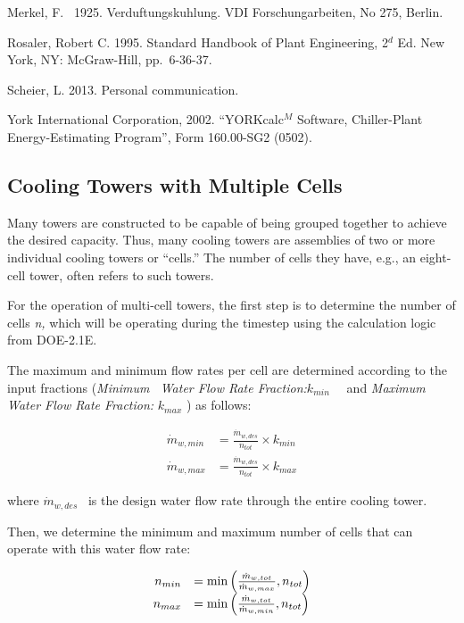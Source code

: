 Merkel, F.~ 1925. Verduftungskuhlung. VDI Forschungarbeiten, No 275, Berlin.

Rosaler, Robert C. 1995. Standard Handbook of Plant Engineering, 2\(^{d}\) Ed. New York, NY: McGraw-Hill, pp.~6-36-37.

Scheier, L. 2013. Personal communication.

York International Corporation, 2002. ``YORKcalc\(^{M}\) Software, Chiller-Plant Energy-Estimating Program'', Form 160.00-SG2 (0502).

\subsection{Cooling Towers with Multiple Cells}\label{cooling-towers-with-multiple-cells}

Many towers are constructed to be capable of being grouped together to achieve the desired capacity. Thus, many cooling towers are assemblies of two or more individual cooling towers or ``cells.'' The number of cells they have, e.g., an eight-cell tower, often refers to such towers.

For the operation of multi-cell towers, the first step is to determine the number of cells \emph{n,} which will be operating during the timestep using the calculation logic from DOE-2.1E.

The maximum and minimum flow rates per cell are determined according to the input fractions (\emph{Minimum~ Water Flow Rate Fraction:}\({k_{min}}\) \emph{~}~and \emph{Maximum~ Water Flow Rate Fraction:} \({k_{max}}\) ) as follows:

\begin{equation}
    \begin{array}{rl}
      \dot{m}_{w,min} &= \frac{\dot{m}_{w,des}}{n_{tot}} \times k_{min} \\
      \dot{m}_{w,max} &= \frac{\dot{m}_{w,des}}{n_{tot}} \times k_{max}
    \end{array}
\end{equation}

where \({{{\dot m}_{w,des}}}\) ~is the design water flow rate through the entire cooling tower.

Then, we determine the minimum and maximum number of cells that can operate with this water flow rate:

\begin{equation}
    \begin{array}{rl}
      n_{min} & = \min\PB{\frac{\dot{m}_{w,tot}}{\dot{m}_{w,max}},n_{tot}} \\
      n_{max} & = \min\PB{\frac{\dot{m}_{w,tot}}{\dot{m}_{w,min}},n_{tot}}
    \end{array}
\end{equation}

